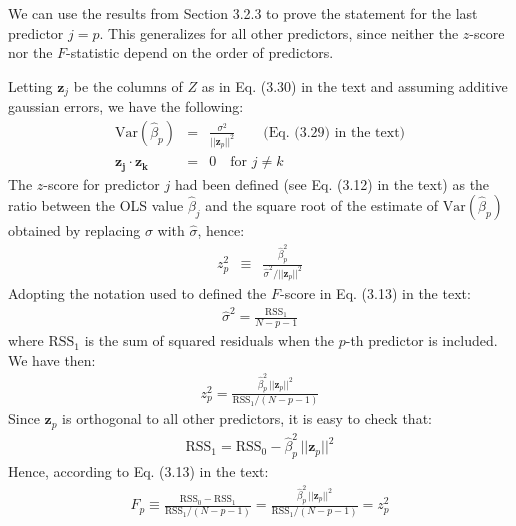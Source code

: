 

We can use the results from Section 3.2.3 to prove the statement for the last predictor $j = p$. This generalizes for all other predictors, since neither the $z$-score nor the $F$-statistic depend on the order of predictors.

Letting $ \mathbf{z}_j$ be the columns of $Z$ as in Eq. (3.30) in the text and assuming additive gaussian errors, 
we have the following:
\begin{eqnarray*}
    \textrm{Var}(\hat{\beta}_p) & = & \frac{\sigma^2}{|| \mathbf{z}_p||^2} \qquad \textrm{(Eq. (3.29) in the text)}\\
    \mathbf{z_j} \cdot \mathbf{z_k} & = & 0 \quad \textrm{for } j \neq k
\end{eqnarray*}
The $z$-score for predictor $j$ had been defined (see Eq. (3.12) in the text) as the ratio between the OLS value $\hat{\beta}_j$
and the square root of the estimate of $\textrm{Var}(\hat{\beta}_p)$ obtained by replacing $\sigma$ with $\hat{\sigma}$, hence:
\begin{eqnarray*}
    z_p^2 & \equiv & \frac{\hat{\beta}_p^2}{\hat{\sigma}^2 / || \mathbf{z}_p||^2}
\end{eqnarray*}
Adopting the notation used to defined the $F$-score in Eq. (3.13) in the text:
\begin{eqnarray*}
    \hat{\sigma}^2 = \frac{\textrm{RSS}_1}{N - p - 1}
\end{eqnarray*}
where $\textrm{RSS}_1$ is the sum of squared residuals when the $p$-th predictor is included. We have then:
\begin{eqnarray*}
    z_p^2 = \frac{\hat{\beta}_p ^2\,|| \mathbf{z}_p||^2}{\textrm{RSS}_1 / (N - p - 1)}
\end{eqnarray*}
Since $\mathbf{z}_p$ is orthogonal to all other predictors, it is easy to check that:
\begin{eqnarray*}
    \textrm{RSS}_1 = \textrm{RSS}_0 - \hat{\beta}_p^2 \, || \mathbf{z}_p ||^2
\end{eqnarray*}
Hence, according to Eq. (3.13) in the text:
\begin{eqnarray*}
    F_{p} \equiv \frac{\textrm{RSS}_0 - \textrm{RSS}_1}{\textrm{RSS}_1 / (N - p - 1)} = \frac{\hat{\beta}_p^2 \, || \mathbf{z}_p ||^2}{\textrm{RSS}_1 / (N - p - 1)} = z_p^2
\end{eqnarray*}